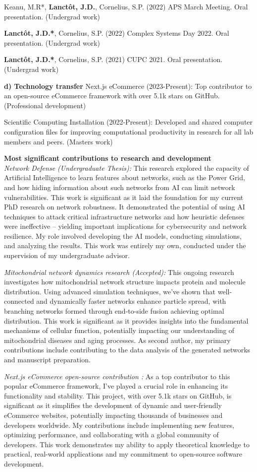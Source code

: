 \begin{contributions}
Keanu, M.R*, \textbf{Lanct\^{o}t, J.D.}, Cornelius, S.P. (2022) APS March Meeting. Oral presentation. (Undergrad work)

\textbf{Lanct\^{o}t, J.D.*}, Cornelius, S.P. (2022) Complex Systems Day 2022. Oral presentation. (Undergrad work)

\textbf{Lanct\^{o}t, J.D.*}, Cornelius, S.P. (2021) CUPC 2021. Oral presentation. (Undergrad work)

\textbf{d) Technology transfer}
Next.js eCommerce (2023-Present): Top contributor to an open-source eCommerce framework with over 5.1k stars on GitHub. (Professional development)

Scientific Computing Installation (2022-Present): Developed and shared computer configuration files for improving computational productivity in research for all lab members and peers. (Masters work)

\textbf{Most significant contributions to research and development}\\
\textit{Network Defense (Undergraduate Thesis):} This research explored the capacity of Artificial Intelligence to learn features about networks, such as the Power Grid, and how hiding information about such networks from AI can limit network vulnerabilities. This work is significant as it laid the foundation for my current PhD research on network robustness. It demonstrated the potential of using AI techniques to attack critical infrastructure networks and how heuristic defenses were ineffective -- yielding important implications for cybersecurity and network resilience. My role involved developing the AI models, conducting simulations, and analyzing the results. This work was entirely my own, conducted under the supervision of my undergraduate advisor.

\textit{Mitochondrial network dynamics research (Accepted):} This ongoing research investigates how mitochondrial network structure impacts protein and molecule distribution. Using advanced simulation techniques, we've shown that well-connected and dynamically faster networks enhance particle spread, with branching networks formed through end-to-side fusion achieving optimal distribution. This work is significant as it provides insights into the fundamental mechanisms of cellular function, potentially impacting our understanding of mitochondrial diseases and aging processes. As second author, my primary contributions include contributing to the data analysis of the generated networks and manuscript preparation.

\textit{Next.js eCommerce open-source contribution :} As a top contributor to this popular eCommerce framework, I've played a crucial role in enhancing its functionality and stability. This project, with over 5.1k stars on GitHub, is significant as it simplifies the development of dynamic and user-friendly eCommerce websites, potentially impacting thousands of businesses and developers worldwide. My contributions include implementing new features, optimizing performance, and collaborating with a global community of developers. This work demonstrates my ability to apply theoretical knowledge to practical, real-world applications and my commitment to open-source software development.


\end{contributions}
